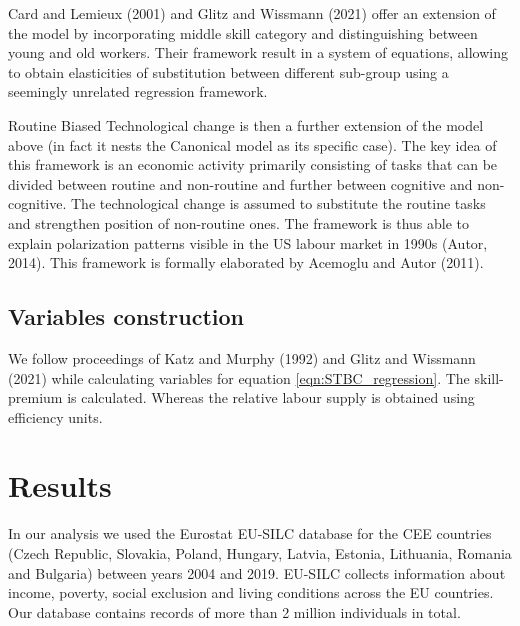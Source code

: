 \documentclass{article}
\begin{document}
Card and Lemieux (2001) and Glitz and Wissmann (2021) offer an extension of the model by incorporating middle skill category and distinguishing between young and old workers. Their framework result in a system of equations, allowing to obtain elasticities of substitution between different sub-group using a seemingly unrelated regression framework.

Routine Biased Technological change is then a further extension of the model above (in fact it nests the Canonical model as its specific case). The key idea of this framework is an economic activity primarily consisting of tasks that can be divided between routine and non-routine and further between cognitive and non-cognitive. The technological change is assumed to substitute the routine tasks and strengthen position of non-routine ones. The framework is thus able to explain polarization patterns visible in the US labour market in 1990s (Autor, 2014). This framework is formally elaborated by Acemoglu and Autor (2011).

\subsection{Variables construction}
We follow proceedings of Katz and Murphy (1992) and Glitz and Wissmann (2021) while calculating variables for equation \ref{eqn:STBC_regression}. The skill-premium is calculated. Whereas the relative labour supply is obtained using efficiency units.


\section{Results}
In our analysis we used the Eurostat EU-SILC database for the CEE countries (Czech Republic, Slovakia, Poland, Hungary, Latvia, Estonia, Lithuania, Romania and Bulgaria) between years 2004 and 2019. EU-SILC collects information about income, poverty, social exclusion and living conditions across the EU countries. Our database contains records of more than 2 million individuals in total.
\end{document}
